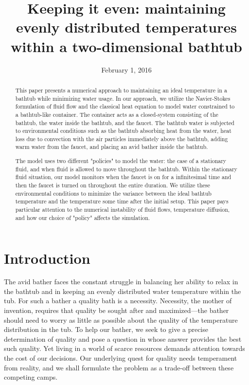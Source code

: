 \documentclass[12pt]{amsart}
\title{Keeping it even: maintaining evenly distributed temperatures within a
two-dimensional bathtub}
\date{February 1, 2016}
\begin{document}
\maketitle

\thispagestyle{fancy}
\tableofcontents

\begin{abstract}
This paper presents a numerical approach to maintaining an ideal temperature in a bathtub while minimizing water usage. In our approach, we utilize the Navier-Stokes formulation of fluid flow and the classical heat equation to model water constrained to a bathtub-like container. The container acts as a closed-system consisting of the bathtub, the water inside the bathtub, and the faucet. The bathtub water is subjected to environmental conditions such as the bathtub absorbing heat from the water, heat loss due to convection with the air particles immediately above the bathtub, adding warm water from the faucet, and placing an avid bather inside the bathtub.

The model uses two different "policies" to model the water: the case of a stationary fluid, and when fluid is allowed to move throughout the bathtub. Within the stationary fluid situation, our model monitors when the faucet is on for a infinitesimal time and then the faucet is turned on throughout the entire duration. We utilize these environmental conditions to minimize the variance between the ideal bathtub temperature and the temperature some time after the initial setup. This paper pays particular attention to the numerical instability of fluid flows, temperature diffusion, and how our choice of "policy" affects the simulation.
\end{abstract}

\section{Introduction}

The avid bather faces the constant struggle in balancing her ability to relax in
the bathtub and in keeping an evenly distributed water temperature within the
tub. For such a bather a quality bath is a necessity. Necessity, the mother of
invention, requires that quality be sought after and maximized---the bather
should need to worry as little as possible about the quality of the temperature
distribution in the tub. To help our bather, we seek to give a precise
determination of quality and pose a question in whose answer provides the best
such quality. Yet living in a world of scarce resources demands attention
towards the cost of our decisions. Our underlying quest for quality needs
temperament from reality, and we shall formulate the problem as a trade-off
between these competing camps.
\end{document}
